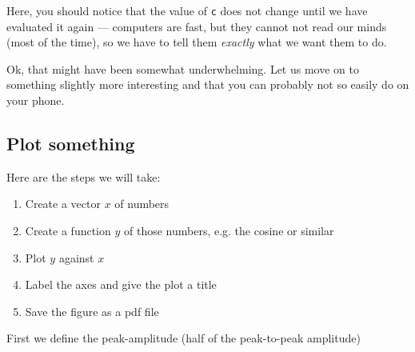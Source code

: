 Here, you should notice that the value of \lstinline{c} does not change until we have evaluated it again --- computers are fast, but they cannot not read our minds (most of the time), so we have to tell them \emph{exactly} what we want them to do.

Ok, that might have been somewhat underwhelming.  
Let us move on to something slightly more interesting and that you can probably not so easily do on your phone.

\subsection{Plot something}
Here are the steps we will take:

\begin{enumerate}
\item Create a vector $x$ of numbers
\item Create a function $y$ of those numbers, e.g. the cosine or similar
\item Plot $y$ against $x$
\item Label the axes and give the plot a title
\item Save the figure as a pdf file
\end{enumerate}

First we define the peak-amplitude (half of the peak-to-peak amplitude)